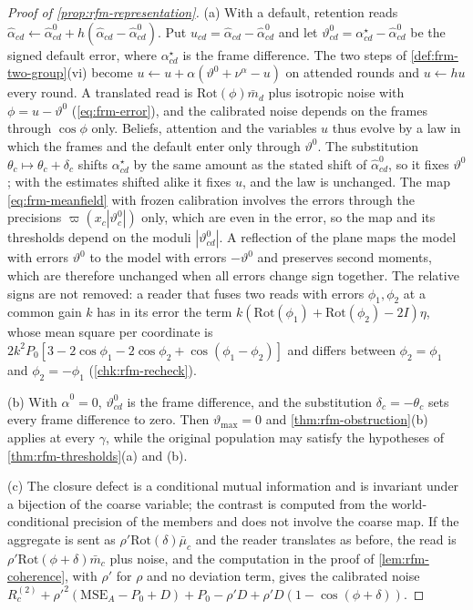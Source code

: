 \begin{proof}[Proof of \cref{prop:rfm-representation}]
(a) With a default, retention reads $\hat\alpha_{cd}\leftarrow\hat\alpha^0_{cd}+h(\hat\alpha_{cd}-\hat\alpha^0_{cd})$. Put $u_{cd}=\hat\alpha_{cd}-\hat\alpha^0_{cd}$ and let $\vartheta^{0}_{cd}=\alpha^\star_{cd}-\hat\alpha^0_{cd}$ be the signed default error, where $\alpha^\star_{cd}$ is the frame difference. The two steps of \cref{def:frm-two-group}(vi) become $u\leftarrow u+\alpha(\vartheta^0+\nu^\alpha-u)$ on attended rounds and $u\leftarrow hu$ every round. A translated read is $\mathrm{Rot}(\phi)\bar m_d$ plus isotropic noise with $\phi=u-\vartheta^0$ (\cref{eq:frm-error}), and the calibrated noise depends on the frames through $\cos\phi$ only. Beliefs, attention and the variables $u$ thus evolve by a law in which the frames and the default enter only through $\vartheta^0$. The substitution $\theta_c\mapsto\theta_c+\delta_c$ shifts $\alpha^\star_{cd}$ by the same amount as the stated shift of $\hat\alpha^0_{cd}$, so it fixes $\vartheta^0$; with the estimates shifted alike it fixes $u$, and the law is unchanged. The map \eqref{eq:frm-meanfield} with frozen calibration involves the errors through the precisions $\varpi(x_c|\vartheta^0_c|)$ only, which are even in the error, so the map and its thresholds depend on the moduli $|\vartheta^0_{cd}|$. A reflection of the plane maps the model with errors $\vartheta^0$ to the model with errors $-\vartheta^0$ and preserves second moments, which are therefore unchanged when all errors change sign together. The relative signs are not removed: a reader that fuses two reads with errors $\phi_1,\phi_2$ at a common gain $k$ has in its error the term $k(\mathrm{Rot}(\phi_1)+\mathrm{Rot}(\phi_2)-2I)\eta$, whose mean square per coordinate is $2k^2P_0[3-2\cos\phi_1-2\cos\phi_2+\cos(\phi_1-\phi_2)]$ and differs between $\phi_2=\phi_1$ and $\phi_2=-\phi_1$ (\cref{chk:rfm-recheck}).

(b) With $\hat\alpha^0=0$, $\vartheta^0_{cd}$ is the frame difference, and the substitution $\delta_c=-\theta_c$ sets every frame difference to zero. Then $\vartheta_{\max}=0$ and \cref{thm:rfm-obstruction}(b) applies at every $\gamma$, while the original population may satisfy the hypotheses of \cref{thm:rfm-thresholds}(a) and (b).

(c) The closure defect is a conditional mutual information and is invariant under a bijection of the coarse variable; the contrast is computed from the world-conditional precision of the members and does not involve the coarse map. If the aggregate is sent as $\rho'\mathrm{Rot}(\delta)\bar\mu_c$ and the reader translates as before, the read is $\rho'\mathrm{Rot}(\phi+\delta)\bar m_c$ plus noise, and the computation in the proof of \cref{lem:rfm-coherence}, with $\rho'$ for $\rho$ and no deviation term, gives the calibrated noise $R_c^{(2)}+\rho'^2(\mathrm{MSE}_A-P_0+D)+P_0-\rho'D+\rho'D(1-\cos(\phi+\delta))$.
\end{proof}

